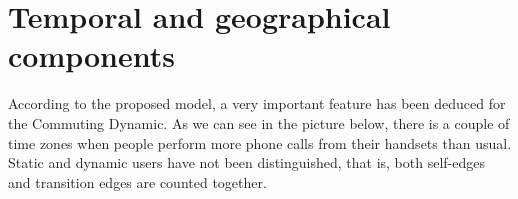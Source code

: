 \newpage
\section{Temporal and geographical components}

According to the proposed model, a very important feature has been deduced for the Commuting Dynamic. As we can see in the picture below, there is a couple of time zones when people perform more phone calls from their handsets than usual. Static and dynamic users have not been distinguished, that is, both self-edges and transition edges are counted together.

\begin{figure}[ht]
\centering
{}
\label{fig:fig1}
\end{figure}

